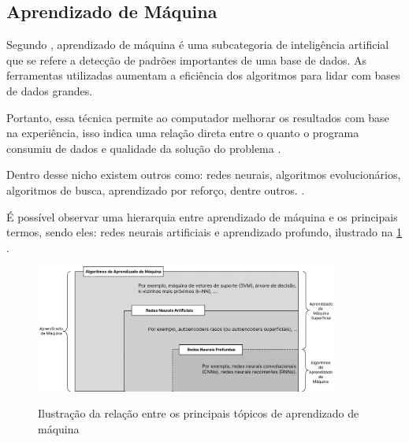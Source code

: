 \subsection{Aprendizado de Máquina}

Segundo \space{}, aprendizado de máquina é uma subcategoria de inteligência artificial que se refere  a detecção de padrões importantes de uma base de dados. As ferramentas utilizadas aumentam a eficiência dos algoritmos para lidar com bases de dados grandes.

Portanto, essa técnica permite ao computador melhorar os resultados com base na experiência, isso indica uma relação direta entre o quanto o programa consumiu de dados e qualidade da solução do problema \space\cite{ml_explicado}. 

Dentro desse nicho existem outros como: redes neurais, algoritmos evolucionários, algoritmos de busca, aprendizado por reforço, dentre outros. \space\cite{ml_oil_gas_industry}.

É possível observar uma hierarquia entre aprendizado de máquina e os principais termos, sendo eles: redes neurais artificiais e aprendizado profundo, ilustrado na \cref{fig:diagrama_ann} \space\cite{ml_and_dp}.

\begin{figure}[ht]
	\caption{Ilustração da relação entre os principais tópicos de aprendizado de máquina}
	\centering %
	\includegraphics[width=10cm]{figures/diagrama_ann.png} %
	\label{fig:diagrama_ann}
\end{figure}
